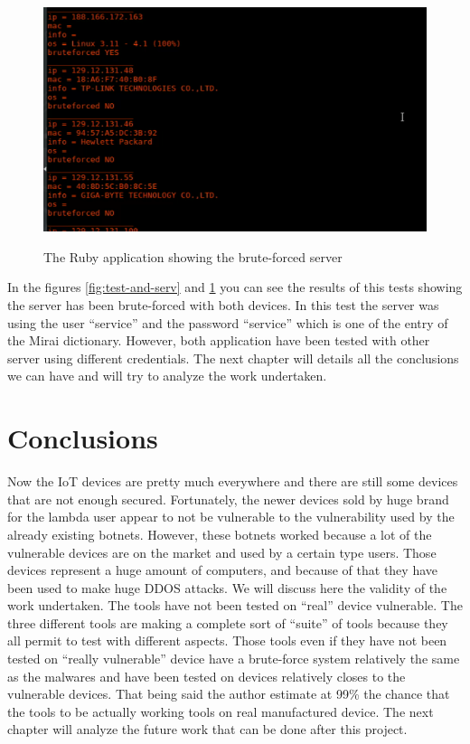 \documentclass{report}
\begin{document}
\begin{figure}[h]
 \caption{The Ruby application showing the brute-forced server}
 \centering
 \includegraphics[width=1.2\textwidth]{./img/exp/screen-test-ruby}
 \label{fig:test-ruby-serv}
\end{figure}
In the figures \ref{fig:test-and-serv} and \ref{fig:test-ruby-serv} you can see the results of this tests showing the server has been brute-forced with both devices. In this test the server was using the user ``service'' and the password ``service'' which is one of the entry of the Mirai dictionary. However, both application have been tested with other server using different credentials.\newline
The next chapter will details all the conclusions we can have and will try to analyze the work undertaken.

\chapter{Conclusions}
Now the IoT devices are pretty much everywhere and there are still some devices that are not enough secured. Fortunately, the newer devices sold by huge brand for the lambda user appear to not be vulnerable to the vulnerability used by the already existing botnets. However, these botnets worked because a lot of the vulnerable devices are on the market and used by a certain type users. Those devices represent a huge amount of computers, and because of that they have been used to make huge DDOS attacks. We will discuss here the validity of the work undertaken.\newline
The tools have not been tested on ``real'' device vulnerable.\newline
The three different tools are making a complete sort of ``suite'' of tools because they all permit to test with different aspects.\newline
Those tools even if they have not been tested on ``really vulnerable'' device have a brute-force system relatively the same as the malwares and have been tested on devices relatively closes to the vulnerable devices. That being said the author estimate at 99\% the chance that the tools to be actually working tools on real manufactured device.\newline
The next chapter will analyze the future work that can be done after this project.
\end{document}
